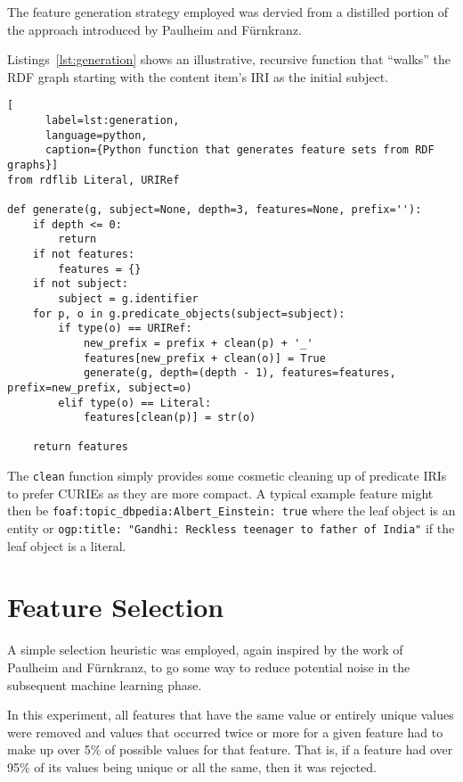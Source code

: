 The feature generation strategy employed was dervied from a distilled
portion of the approach introduced by Paulheim
and F\"urnkranz\cite{paulheim2012unsupervised}.

Listings~\ref{lst:generation} shows an illustrative, recursive
function that ``walks'' the RDF graph starting with the content
item's IRI as the initial subject.

\begin{centering}
  \begin{lstlisting}[
      label=lst:generation,
      language=python,
      caption={Python function that generates feature sets from RDF graphs}]
from rdflib Literal, URIRef
    
def generate(g, subject=None, depth=3, features=None, prefix=''):
    if depth <= 0:
        return
    if not features:
        features = {}
    if not subject:
        subject = g.identifier
    for p, o in g.predicate_objects(subject=subject):
        if type(o) == URIRef:
            new_prefix = prefix + clean(p) + '_'
            features[new_prefix + clean(o)] = True
            generate(g, depth=(depth - 1), features=features, prefix=new_prefix, subject=o)
        elif type(o) == Literal:
            features[clean(p)] = str(o)

    return features
  \end{lstlisting}
\end{centering}

The \texttt{clean} function simply provides some cosmetic cleaning
up of predicate IRIs to prefer CURIEs as they are more compact. A
typical example feature might then be
\texttt{foaf:topic\_dbpedia:Albert\_Einstein: true} where the leaf
object is an entity or
\texttt{ogp:title: "Gandhi: Reckless teenager to father of India"} if
the leaf object is a literal.

\section{Feature Selection}

A simple selection heuristic was employed, again inspired by the work
of Paulheim and F\"urnkranz\cite{paulheim2012unsupervised}, to go
some way to reduce potential noise in the subsequent machine learning
phase.

In this experiment, all features that have the same value or entirely
unique values were removed and values that occurred twice or more
for a given feature had to make up over 5\% of possible values for
that feature. That is, if a feature had over 95\% of its values being
unique or all the same, then it was rejected.

